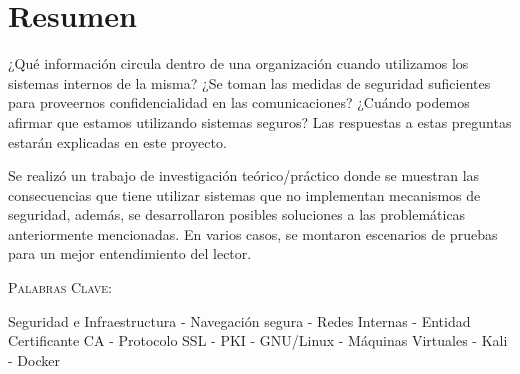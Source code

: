 \thispagestyle{empty}
\chapter*{Resumen}


\bigskip

¿Qué información circula dentro de una organización cuando utilizamos los sistemas internos 
de la misma?
¿Se toman las medidas de seguridad suficientes para proveernos confidencialidad en las 
comunicaciones? ¿Cuándo podemos afirmar que estamos 
utilizando sistemas seguros? Las respuestas a estas preguntas estarán explicadas en este
proyecto.

Se realizó un trabajo de investigación teórico/práctico donde se muestran las consecuencias
que tiene utilizar sistemas que no implementan mecanismos de seguridad, además, 
se desarrollaron posibles soluciones a las problemáticas anteriormente mencionadas. En varios 
casos, se montaron escenarios de pruebas para un mejor entendimiento del lector.


\bigskip
\noindent \textsc{Palabras Clave:} \par

Seguridad e Infraestructura - Navegación segura - Redes Internas -  Entidad Certificante CA - Protocolo SSL - 
PKI - GNU/Linux - Máquinas Virtuales - Kali - Docker
